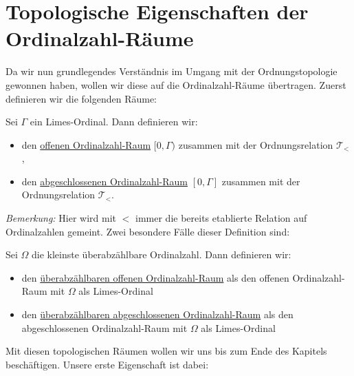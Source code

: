 \documentclass[11pt]{scrartcl}
\begin{document}
\section{Topologische Eigenschaften der Ordinalzahl-Räume}
Da wir nun grundlegendes Verständnis im Umgang mit der Ordnungstopologie gewonnen haben, wollen wir diese auf die Ordinalzahl-Räume übertragen. Zuerst definieren wir die folgenden Räume:
\begin{definition}
	Sei $\Gamma$ ein Limes-Ordinal. Dann definieren wir:
	\begin{itemize}
		\item den \underline{offenen Ordinalzahl-Raum} $[0,\Gamma)$ zusammen mit der Ordnungsrelation $\mathcal T_{<}$,
		\item den \underline{abgeschlossenen Ordinalzahl-Raum} $[0,\Gamma]$ zusammen mit der Ordnungsrelation $\mathcal T_{<}$.
	\end{itemize}
\end{definition}
\noindent \textit{Bemerkung: } Hier wird mit $<$ immer die bereits etablierte Relation auf Ordinalzahlen gemeint.
Zwei besondere Fälle dieser Definition sind:
\begin{definition}
	Sei $\Omega$ die kleinste überabzählbare Ordinalzahl. Dann definieren wir:
	\begin{itemize}
		\item den \underline{überabzählbaren offenen Ordinalzahl-Raum} als den offenen Ordinalzahl-Raum mit $\Omega$ als Limes-Ordinal
		\item den \underline{überabzählbaren abgeschlossenen Ordinalzahl-Raum} als den abgeschlossenen Ordinalzahl-Raum mit $\Omega$ als Limes-Ordinal
	\end{itemize}
\end{definition}
\noindent Mit diesen topologischen Räumen wollen wir uns bis zum Ende des Kapitels beschäftigen. Unsere erste Eigenschaft ist dabei:
\end{document}

